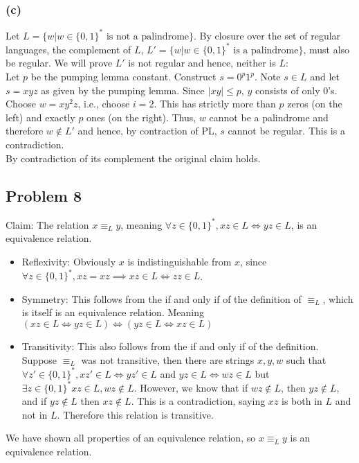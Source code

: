 \documentclass[english]{article}
\begin{document}
\subsubsection*{(c)}
Let $L = \{w|w \in \{0,1\}^* \text{ is not a palindrome}\}$. By closure over the set of regular languages, the complement of $L$, $L' = \{w|w \in \{0,1\}^* \text{ is a palindrome}\}$, must also be regular. We will prove $L'$ is not regular and hence, neither is $L$:\\
Let $p$ be the pumping lemma constant. Construct $s = 0^p 1^p$.
Note $s \in L$ and let $s = xyz$ as given by the pumping lemma.
Since $|xy| \leq p$, $y$ consists of only $0$'s. Choose $w = xy^2 z$, i.e., choose $i=2$. This has strictly more than $p$ zeros (on the left) and exactly $p$ ones (on the right). Thus, $w$ cannot be a palindrome and therefore $w \notin L'$ and hence, by contraction of PL, $s$ cannot be regular. This is a contradiction.\\
By contradiction of its complement the original claim holds.

\subsection*{Problem 8}
Claim: The relation $x \equiv_L y$, meaning $\forall z \in \{0,1\}^*, xz \in L \iff yz \in L$, is an equivalence relation.
\begin{itemize}
\item Reflexivity: Obviously $x$ is indistinguishable from $x$, since $\forall z \in \{0,1\}^*, xz = xz \implies xz \in L \iff zz \in L$.
\item Symmetry: This follows from the if and only if of the definition of $\equiv_L$, which is itself is an equivalence relation. Meaning $(xz \in L \iff yz \in L) \iff (yz \in L \iff xz \in L)$
\item Transitivity: This also follows from the if and only if of the definition. Suppose $\equiv_L$ was not transitive, then there are strings $x,y,w$ such that $\forall z' \in \{0,1\}^*, xz' \in L \iff yz' \in L$ and $yz \in L \iff wz \in L$ but $\exists z \in \{0,1\}^* xz \in L, wz \notin L$. However, we know that if $wz \notin L$, then $yz \notin L$, and if $yz \notin L$ then $xz \notin L$. This is a contradiction, saying $xz$ is both in $L$ and not in $L$. Therefore this relation is transitive.
\end{itemize}

We have shown all properties of an equivalence relation, so $x \equiv_L y$ is an equivalence relation.
\end{document}
